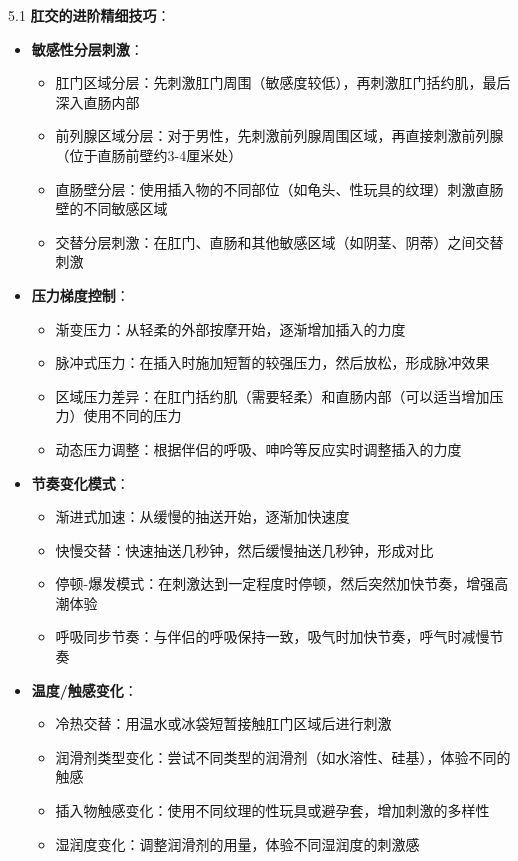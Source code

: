 \documentclass[12pt,UTF8]{ctexbook}
\begin{document}
5.1 \textbf{肛交的进阶精细技巧}：
\begin{itemize}
	\item \textbf{敏感性分层刺激}：
	\begin{itemize}
		\item 肛门区域分层：先刺激肛门周围（敏感度较低），再刺激肛门括约肌，最后深入直肠内部
		\item 前列腺区域分层：对于男性，先刺激前列腺周围区域，再直接刺激前列腺（位于直肠前壁约3-4厘米处）
		\item 直肠壁分层：使用插入物的不同部位（如龟头、性玩具的纹理）刺激直肠壁的不同敏感区域
		\item 交替分层刺激：在肛门、直肠和其他敏感区域（如阴茎、阴蒂）之间交替刺激
	\end{itemize}
	\item \textbf{压力梯度控制}：
	\begin{itemize}
		\item 渐变压力：从轻柔的外部按摩开始，逐渐增加插入的力度
		\item 脉冲式压力：在插入时施加短暂的较强压力，然后放松，形成脉冲效果
		\item 区域压力差异：在肛门括约肌（需要轻柔）和直肠内部（可以适当增加压力）使用不同的压力
		\item 动态压力调整：根据伴侣的呼吸、呻吟等反应实时调整插入的力度
	\end{itemize}
	\item \textbf{节奏变化模式}：
	\begin{itemize}
		\item 渐进式加速：从缓慢的抽送开始，逐渐加快速度
		\item 快慢交替：快速抽送几秒钟，然后缓慢抽送几秒钟，形成对比
		\item 停顿-爆发模式：在刺激达到一定程度时停顿，然后突然加快节奏，增强高潮体验
		\item 呼吸同步节奏：与伴侣的呼吸保持一致，吸气时加快节奏，呼气时减慢节奏
	\end{itemize}
	\item \textbf{温度/触感变化}：
	\begin{itemize}
		\item 冷热交替：用温水或冰袋短暂接触肛门区域后进行刺激
		\item 润滑剂类型变化：尝试不同类型的润滑剂（如水溶性、硅基），体验不同的触感
		\item 插入物触感变化：使用不同纹理的性玩具或避孕套，增加刺激的多样性
		\item 湿润度变化：调整润滑剂的用量，体验不同湿润度的刺激感
	\end{itemize}
\end{itemize}
\end{document}
